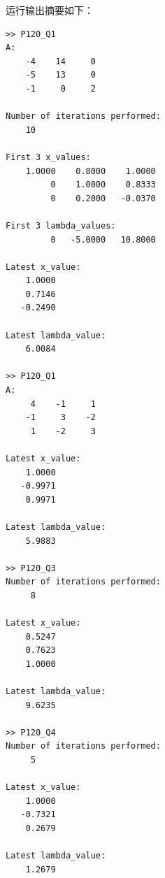 \documentclass[11pt, a4paper]{ctexart}
\begin{document}
    运行输出摘要如下：

\begin{lstlisting}
>> P120_Q1
A:
    -4    14     0
    -5    13     0
    -1     0     2

Number of iterations performed:
    10

First 3 x_values:
    1.0000    0.8000    1.0000
         0    1.0000    0.8333
         0    0.2000   -0.0370

First 3 lambda_values:
         0   -5.0000   10.8000

Latest x_value:
    1.0000
    0.7146
   -0.2490

Latest lambda_value:
    6.0084

>> P120_Q1
A:
     4    -1     1
    -1     3    -2
     1    -2     3

Latest x_value:
    1.0000
   -0.9971
    0.9971

Latest lambda_value:
    5.9883

>> P120_Q3
Number of iterations performed:
     8

Latest x_value:
    0.5247
    0.7623
    1.0000

Latest lambda_value:
    9.6235

>> P120_Q4
Number of iterations performed:
     5

Latest x_value:
    1.0000
   -0.7321
    0.2679

Latest lambda_value:
    1.2679
\end{lstlisting}
\end{document}
